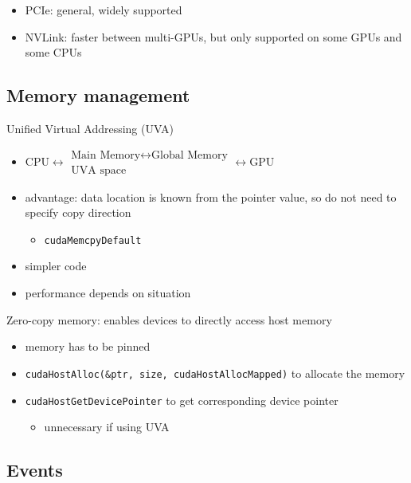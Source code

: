 \documentclass{article}
\begin{document}
\begin{itemize}
\item PCIe: general, widely supported
\item NVLink: faster between multi-GPUs, but only supported on some GPUs and some CPUs

\end{itemize}
\subsection{Memory management}

Unified Virtual Addressing (UVA)

\begin{itemize}
\item $\text{CPU} \longleftrightarrow \substack{\boxed{\text{Main Memory} \longleftrightarrow \text{Global Memory}}\\\text{UVA space}} \longleftrightarrow \text{GPU}$
\item advantage: data location is known from the pointer value, so do not need to specify copy direction
\begin{itemize}
\item \texttt{cudaMemcpyDefault}
\end{itemize}
\item simpler code
\item performance depends on situation

\end{itemize}
Zero-copy memory: enables devices to directly access host memory

\begin{itemize}
\item memory has to be pinned
\item \texttt{cudaHostAlloc(\&ptr, size, cudaHostAllocMapped)} to allocate the memory
\item \texttt{cudaHostGetDevicePointer} to get corresponding device pointer
\begin{itemize}
\item unnecessary if using UVA

\end{itemize}
\end{itemize}
\subsection{Events}
\end{document}
